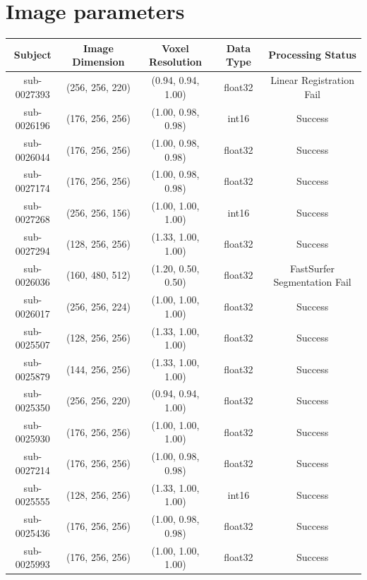 \section{Image parameters}
\label{appendix:data}

\begin{table}[ht!]

\centering
\begin{tabular}{|c c c c c|} 
 \hline
 Subject & Image Dimension & Voxel Resolution & Data Type & Processing Status \\ [0.5ex] 
 \hline\hline
sub-0027393 & (256, 256, 220) & (0.94, 0.94, 1.00) & float32 & Linear Registration Fail \\
sub-0026196 & (176, 256, 256) & (1.00, 0.98, 0.98) & int16 & Success \\
sub-0026044 & (176, 256, 256) & (1.00, 0.98, 0.98) & float32 & Success \\
sub-0027174 & (176, 256, 256) & (1.00, 0.98, 0.98) & float32 & Success \\
sub-0027268 & (256, 256, 156) & (1.00, 1.00, 1.00) & int16 & Success \\
sub-0027294 & (128, 256, 256) & (1.33, 1.00, 1.00) & float32 & Success \\
sub-0026036 & (160, 480, 512) & (1.20, 0.50, 0.50) & float32 & FastSurfer Segmentation Fail \\
sub-0026017 & (256, 256, 224) & (1.00, 1.00, 1.00) & float32 & Success \\
sub-0025507 & (128, 256, 256) & (1.33, 1.00, 1.00) & float32 & Success \\
sub-0025879 & (144, 256, 256) & (1.33, 1.00, 1.00) & float32 & Success \\
sub-0025350 & (256, 256, 220) & (0.94, 0.94, 1.00) & float32 & Success \\
sub-0025930 & (176, 256, 256) & (1.00, 1.00, 1.00) & float32 & Success \\
sub-0027214 & (176, 256, 256) & (1.00, 0.98, 0.98) & float32 & Success \\
sub-0025555 & (128, 256, 256) & (1.33, 1.00, 1.00) & int16 & Success \\
sub-0025436 & (176, 256, 256) & (1.00, 0.98, 0.98) & float32 & Success \\
sub-0025993 & (176, 256, 256) & (1.00, 1.00, 1.00) & float32 & Success \\

\end{tabular}
\end{table}
